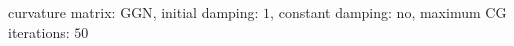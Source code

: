 curvature matrix: $\text{GGN}$, initial damping: $\num[scientific-notation=false]{1}$, constant damping: $\text{no}$, maximum CG iterations: $\num[scientific-notation=false]{50}$